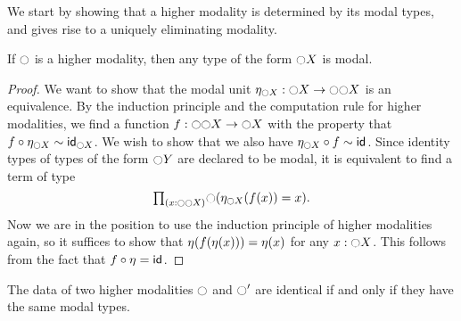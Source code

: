 We start by showing that a higher modality is determined by its modal types, and gives rise to a uniquely eliminating modality.

\begin{lem}
If $\modal$ is a higher modality, then any type of the form $\modal X$ is modal.
\end{lem}

\begin{proof}
  We want to show that the modal unit $\modalunit[\modal X]:\modal X\to\modal\modal X$
is an equivalence. By the induction principle and the computation rule for
higher modalities, we find a function $f:\modal \modal X\to\modal X$ with
the property that $f\circ \modalunit[\modal X]\htpy\idfunc[\modal X]$. We wish to
show that we also have $\modalunit[\modal X]\circ f\htpy\idfunc$. Since identity
types of types of the form $\modal Y$ are declared to be modal, it is
equivalent to find a term of type
\begin{equation*}
\prd{x:\modal \modal X}\modal(\modalunit[\modal X](f(x))=x).
\end{equation*}
Now we are in the position to use the induction principle of higher modalities
again, so it suffices to show that $\modalunit(f(\modalunit(x)))=\modalunit(x)$
for any $x:\modal X$. This follows from the fact that $f\circ\modalunit=\idfunc$.
\end{proof}

\begin{thm}\label{thm:subuniv-highermod}
The data of two higher modalities $\modal$ and $\modal'$
are identical if and only if they have the same modal types.
\end{thm}


